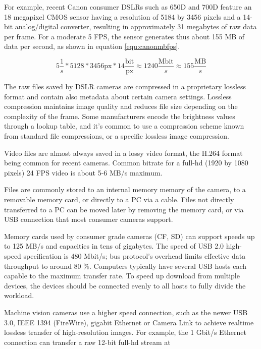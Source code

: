 
For example, recent Canon consumer DSLRs such as 650D and 700D feature an 18 megapixel CMOS sensor having a resolution of 5184 by 3456 pixels and a 14-bit analog/digital converter, resulting in approximately 31 megabytes of raw data per frame.
For a moderate 5 FPS, the sensor generates thus about 155 MB of data per second, as shown in equation \ref{equ:canonmbfps}.

\begin{equation}
	5\frac{1}{s} * 5128 * 3456 \text{px} * 14 \frac{\text{bit}}{\text{px}} \approx 1240 \frac{\text{Mbit}}{s} \approx 155 \frac{\text{MB}}{s}
\end{equation}


The raw files saved by DSLR cameras are compressed in a proprietary lossless format and contain also metadata about certain camera settings.
Lossless compression maintains image quality and reduces file size depending on the complexity of the frame.
Some manufacturers encode the brightness values through a lookup table, and it's common to use a compression scheme known from standard file compressions, or a specific lossless image compression.

Video files are almost always saved in a lossy video format, the H.264 format being common for recent cameras.
Common bitrate for a full-hd (1920 by 1080 pixels) 24 FPS video is about 5-6 MB/s maximum.


Files are commonly stored to an internal memory memory of the camera, to a removable memory card, or directly to a PC via a cable.
Files not directly transferred to a PC can be moved later by removing the memory card, or via USB connection that most consumer cameras support.

Memory cards used by consumer grade cameras (CF, SD) can support speeds up to 125 MB/s and capacities in tens of gigabytes.
The speed of USB 2.0 high-speed specification is 480 Mbit/s; bus protocol's overhead limits effective data throughput to around 80 \%.
Computers typically have several USB hosts each capable to the maximum transfer rate.
To speed up download from multiple devices, the devices should be connected evenly to all hosts to fully divide the workload.

Machine vision cameras use a higher speed connection, such as the newer USB 3.0, IEEE 1394 (FireWire), gigabit Ethernet or Camera Link to achieve realtime lossless transfer of high-resolution images.
For example, the 1 Gbit/s Ethernet connection can transfer a raw 12-bit full-hd stream at

